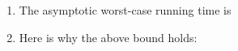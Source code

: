 \newpage

\begin{enumerate}

\item[(e)]   %
  The asymptotic worst-case running time is 

\item[(f)] Here is why the above bound holds:

  \begin{blue}
    \REPLACEME
  \end{blue}
  
\end{enumerate}

